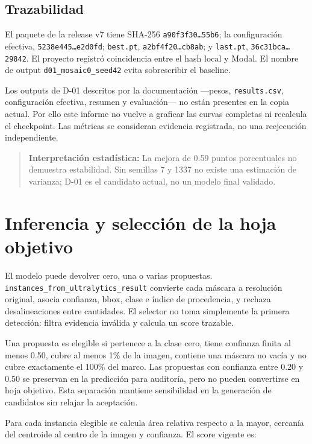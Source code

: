 \documentclass[11pt,a4paper]{article}
\begin{document}
\subsection{Trazabilidad}

El paquete de la release v7 tiene SHA-256 \texttt{a90f3f30…55b6}; la configuración efectiva, \texttt{5238e445…e2d0fd}; \texttt{best.pt}, \texttt{a2bf4f20…cb8ab}; y \texttt{last.pt}, \texttt{36c31bca…29842}. El proyecto registró coincidencia entre el hash local y Modal. El nombre de output \texttt{d01\_mosaic0\_seed42} evita sobrescribir el baseline.


Los outputs de D-01 descritos por la documentación —pesos, \texttt{results.csv}, configuración efectiva, resumen y evaluación— no están presentes en la copia actual. Por ello este informe no vuelve a graficar las curvas completas ni recalcula el checkpoint. Las métricas se consideran evidencia registrada, no una reejecución independiente.


\begin{quote}\textbf{Interpretación estadística:} La mejora de 0.59 puntos porcentuales no demuestra estabilidad. Sin semillas 7 y 1337 no existe una estimación de varianza; D-01 es el candidato actual, no un modelo final validado.\end{quote}

\section{Inferencia y selección de la hoja objetivo}

El modelo puede devolver cero, una o varias propuestas. \texttt{instances\_from\_ultralytics\_result} convierte cada máscara a resolución original, asocia confianza, bbox, clase e índice de procedencia, y rechaza desalineaciones entre cantidades. El selector no toma simplemente la primera detección: filtra evidencia inválida y calcula un score trazable.


Una propuesta es elegible si pertenece a la clase cero, tiene confianza finita al menos 0.50, cubre al menos 1\% de la imagen, contiene una máscara no vacía y no cubre exactamente el 100\% del marco. Las propuestas con confianza entre 0.20 y 0.50 se preservan en la predicción para auditoría, pero no pueden convertirse en hoja objetivo. Esta separación mantiene sensibilidad en la generación de candidatos sin relajar la aceptación.


Para cada instancia elegible se calcula área relativa respecto a la mayor, cercanía del centroide al centro de la imagen y confianza. El score vigente es:
\end{document}

